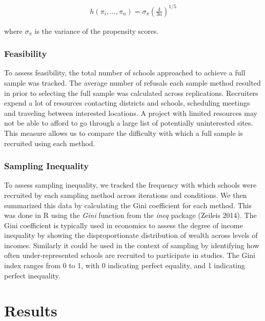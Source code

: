 \documentclass[english,man,floatsintext]{apa6}
\begin{document}
\begin{align}
h(\pi_i,...,\pi_n) = \sigma_{\pi}(\frac{4}{3n})^{1/5}
\end{align}

where \(\sigma_{\pi}\) is the variance of the propensity scores. 

\hypertarget{feasibility}{%
\subsubsection{Feasibility}\label{feasibility}}

To assess feasibility, the total number of schools approached to achieve a full sample was tracked. The average number of refusals each sample method resulted in prior to selecting the full sample was calculated across replications. Recruiters expend a lot of resources contacting districts and schools, scheduling meetings and traveling between interested locations. A project with limited resources may not be able to afford to go through a large list of potentially uninterested sites. This measure allows us to compare the difficulty with which a full sample is recruited using each method.

\hypertarget{sampling-inequality}{%
\subsubsection{Sampling Inequality}\label{sampling-inequality}}

To assess sampling inequality, we tracked the frequency with which schools were recruited by each sampling method across iterations and conditions. We then summarized this data by calculating the Gini coefficient for each method. This was done in R using the \emph{Gini} function from the \emph{ineq} package (Zeileis 2014). The Gini coefficient is typically used in economics to assess the degree of income inequality by showing the disproportionate distribution of wealth across levels of incomes. Similarly it could be used in the context of sampling by identifying how often under-represented schools are recruited to participate in studies. The Gini index ranges from 0 to 1, with 0 indicating perfect equality, and 1 indicating perfect inequality.

\hypertarget{results}{%
\section{Results}\label{results}}
\end{document}
